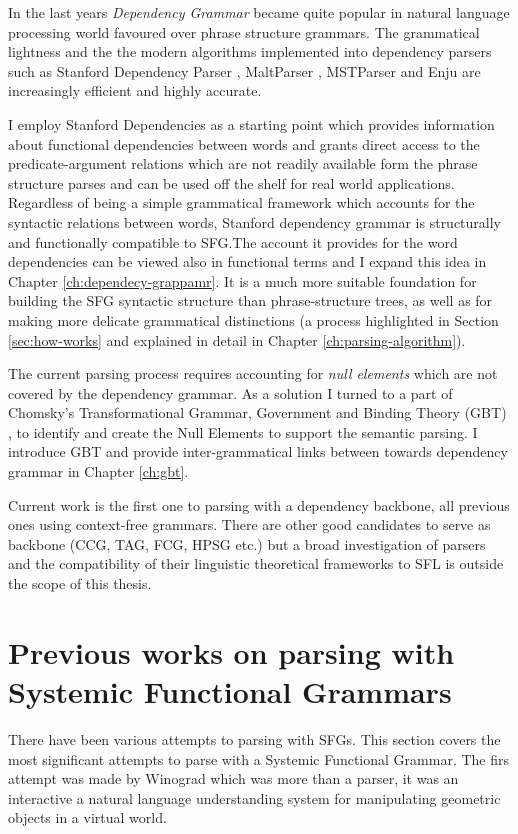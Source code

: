 %
In the last years \textit{Dependency Grammar} \citep{Tensiere2015} became quite popular in natural language processing world favoured over phrase structure grammars. The grammatical lightness and the the modern algorithms implemented into dependency parsers such as Stanford Dependency Parser \citep{Marneffe2006}, MaltParser \citep{Nivre2006}, MSTParser \citep{McDonald2006} and Enju \citep{Miyao2005} are increasingly efficient and highly accurate.

I employ Stanford Dependencies \citep{Marneffe2008a,Marneffe2008, Marneffe2014} as a starting point which provides information about functional dependencies between words and grants direct access to the predicate-argument relations which are not readily available form the phrase structure parses and can be used off the shelf for real world applications. Regardless of being a simple grammatical framework which accounts for the syntactic relations between words, Stanford dependency grammar is structurally and functionally compatible to SFG.The account it provides for the word dependencies can be viewed also in functional terms and I expand this idea in Chapter \ref{ch:dependecy-grappamr}. It is a much more suitable foundation for building the SFG syntactic structure than phrase-structure trees, as well as for making more delicate grammatical distinctions (a process highlighted in Section \ref{sec:how-works} and explained in detail in Chapter \ref{ch:parsing-algorithm}).

The current parsing process requires accounting for \textit{null elements} which are not covered by the dependency  grammar. As a solution I turned to a part of Chomsky's Transformational Grammar\citep{Chomsky1957}, Government and Binding Theory (GBT) \citep{Chomsky1981,Haegeman1991}, to identify and create the Null Elements to support the semantic parsing. I introduce GBT and provide inter-grammatical links between towards dependency grammar in Chapter \ref{ch:gbt}.

Current work is the first one to parsing with a dependency backbone, all previous ones using context-free grammars. 
There are other good candidates to serve as backbone (CCG, TAG, FCG, HPSG etc.) but a broad investigation of parsers and the compatibility of their linguistic theoretical frameworks to SFL is outside the scope of this thesis. 

\section{Previous works on parsing with Systemic Functional Grammars}
\label{sec:sota}
There have been various attempts to parsing with SFGs. This section covers the most significant attempts to parse with a Systemic Functional Grammar. The firs attempt was made by Winograd \citep{Winograd1972} which was more than a parser, it was an interactive a natural language understanding system for manipulating geometric objects in a virtual world.


